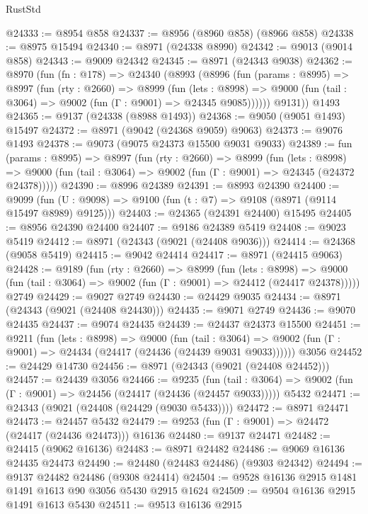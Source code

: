 \begin{lexlean}{RustStd}
\begin{coremodule}
@24333 := @8954 @858
@24337 := @8956 (@8960 @858) (@8966 @858)
@24338 := @8975 @15494
@24340 := @8971 (@24338 @8990)
@24342 := @9013 (@9014 @858)
@24343 := @9009 @24342
@24345 := @8971 (@24343 @9038)
@24362 := @8970
    (fun (fn : @178) =>
    @24340
      (@8993
        (@8996
          (fun (params : @8995) =>
          @8997
            (fun (rty : @2660) =>
            @8999
              (fun (lets : @8998) =>
              @9000 (fun (tail : @3064) => @9002 (fun (Γ : @9001) => @24345 @9085))))))
        @9131))
    @1493
@24365 := @9137 (@24338 (@8988 @1493))
@24368 := @9050 (@9051 @1493) @15497
@24372 := @8971 (@9042 (@24368 @9059) @9063)
@24373 := @9076 @1493
@24378 := @9073 (@9075 @24373 @15500 @9031 @9033)
@24389 := fun (params : @8995) =>
  @8997
    (fun (rty : @2660) =>
    @8999
      (fun (lets : @8998) =>
      @9000 (fun (tail : @3064) => @9002 (fun (Γ : @9001) => @24345 (@24372 @24378)))))
@24390 := @8996 @24389
@24391 := @8993 @24390
@24400 := @9099
    (fun (U : @9098) => @9100 (fun (t : @7) => @9108 (@8971 (@9114 @15497 @8989) @9125)))
@24403 := @24365 (@24391 @24400) @15495
@24405 := @8956 @24390 @24400
@24407 := @9186 @24389 @5419
@24408 := @9023 @5419
@24412 := @8971 (@24343 (@9021 (@24408 @9036)))
@24414 := @24368 (@9058 @5419)
@24415 := @9042 @24414
@24417 := @8971 (@24415 @9063)
@24428 := @9189
    (fun (rty : @2660) =>
    @8999
      (fun (lets : @8998) =>
      @9000 (fun (tail : @3064) => @9002 (fun (Γ : @9001) => @24412 (@24417 @24378)))))
    @2749
@24429 := @9027 @2749
@24430 := @24429 @9035
@24434 := @8971 (@24343 (@9021 (@24408 @24430)))
@24435 := @9071 @2749
@24436 := @9070 @24435
@24437 := @9074 @24435
@24439 := @24437 @24373 @15500
@24451 := @9211
    (fun (lets : @8998) =>
    @9000
      (fun (tail : @3064) =>
      @9002 (fun (Γ : @9001) => @24434 (@24417 (@24436 (@24439 @9031 @9033))))))
    @3056
@24452 := @24429 @14730
@24456 := @8971 (@24343 (@9021 (@24408 @24452)))
@24457 := @24439 @3056
@24466 := @9235
    (fun (tail : @3064) => @9002 (fun (Γ : @9001) => @24456 (@24417 (@24436 (@24457 @9033)))))
    @5432
@24471 := @24343 (@9021 (@24408 (@24429 (@9030 @5433))))
@24472 := @8971 @24471
@24473 := @24457 @5432
@24479 := @9253 (fun (Γ : @9001) => @24472 (@24417 (@24436 @24473))) @16136
@24480 := @9137 @24471
@24482 := @24415 (@9062 @16136)
@24483 := @8971 @24482
@24486 := @9069 @16136 @24435 @24473
@24490 := @24480 (@24483 @24486) (@9303 @24342)
@24494 := @9137 @24482 @24486 (@9308 @24414)
@24504 := @9528 @16136 @2915 @1481 @1491 @1613 @90 @3056 @5430 @2915 @1624
@24509 := @9504 @16136 @2915 @1491 @1613 @5430
@24511 := @9513 @16136 @2915

\end{coremodule}
\end{lexlean}

